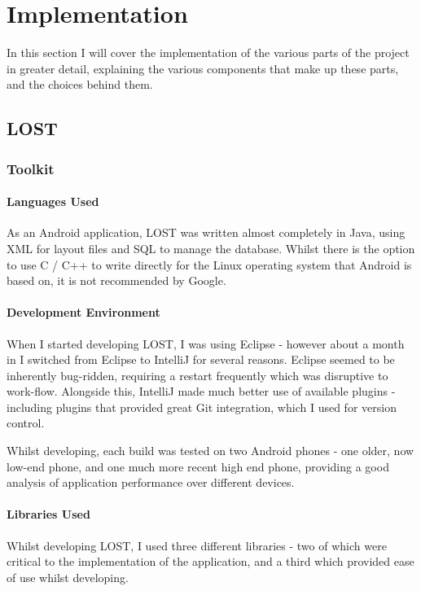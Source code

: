 \documentclass[11pt]{informatics-report}
\begin{document}
\chapter{Implementation}

In this section I will cover the implementation of the various parts of the project in greater detail, explaining the various components that make up these parts, and the choices behind them.

\section{LOST}

\subsection{Toolkit}

\subsubsection{Languages Used}
As an Android application, LOST was written almost completely in Java, using XML for layout files and SQL to manage the database. Whilst there is the option to use C / C++ to write directly for the Linux operating system that Android is based on, it is not recommended by Google.

\subsubsection{Development Environment}

When I started developing LOST, I was using Eclipse - however about a month in I switched from Eclipse to IntelliJ for several reasons. Eclipse seemed to be inherently bug-ridden, requiring a restart frequently which was disruptive to work-flow. Alongside this, IntelliJ made much better use of available plugins - including plugins that provided great Git integration, which I used for version control. 

Whilst developing, each build was tested on two Android phones - one older, now low-end phone, and one much more recent high end phone, providing a good analysis of application performance over different devices.

\subsubsection{Libraries Used}

Whilst developing LOST, I used three different libraries - two of which were critical to the implementation of the application, and a third which provided ease of use whilst developing. 
\end{document}
